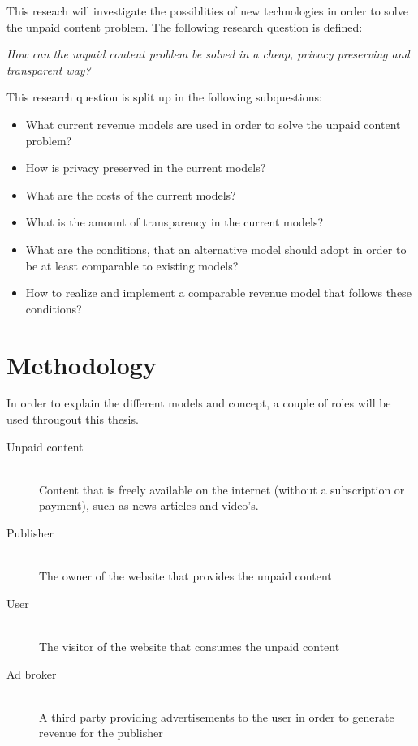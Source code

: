 This reseach will investigate the possiblities of new technologies in order to solve the unpaid content problem. The following research question is defined:
\vspace{1em}

\textit{How can the unpaid content problem be solved in a cheap, privacy preserving and transparent way?}
\vspace{1em}

\noindent This research question is split up in the following subquestions:

\begin{itemize}
  \item What current revenue models are used in order to solve the unpaid content problem?
  \item How is privacy preserved in the current models?
  \item What are the costs of the current models?
  \item What is the amount of transparency in the current models?
  \item What are the conditions, that an alternative model should adopt in order to be at least comparable to existing models?
  \item How to realize and implement a comparable revenue model that follows these conditions?
\end{itemize}

\section{Methodology}
\label{sec:methodology}
In order to explain the different models and concept, a couple of roles will be used througout this thesis.

\begin{description}
  \item[Unpaid content] \hfill \\ Content that is freely available on the internet (without a subscription or payment), such as news articles and video's.
  \item[Publisher] \hfill \\ The owner of the website that provides the unpaid content
  \item[User] \hfill \\ The visitor of the website that consumes the unpaid content
  \item[Ad broker] \hfill \\ A third party providing advertisements to the user in order to generate revenue for the publisher
\end{description} 